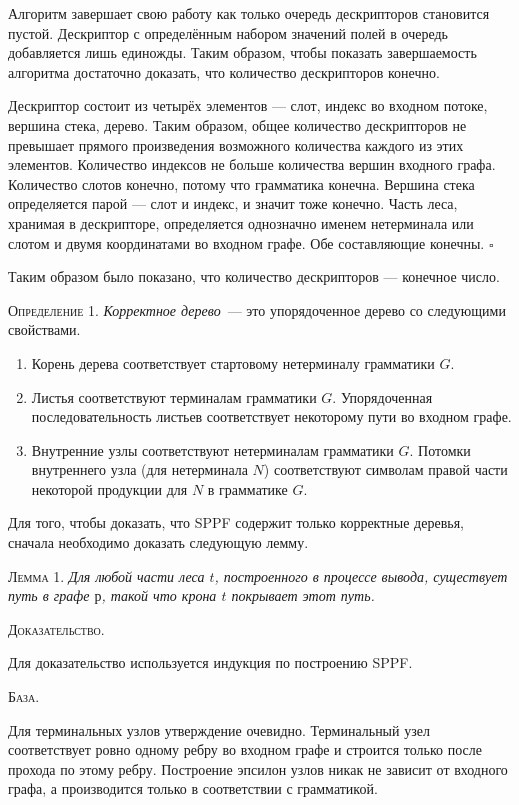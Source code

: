 \documentclass[14pt]{matmex-diploma}
\begin{document}
Алгоритм завершает свою работу как только очередь дескрипторов становится пустой. Дескриптор с определённым набором значений полей в очередь добавляется лишь единожды. Таким образом, чтобы показать завершаемость алгоритма достаточно доказать, что количество дескрипторов конечно. 

Дескриптор состоит из четырёх элементов --- слот, индекс во входном потоке, вершина стека, дерево. Таким образом, общее количество дескрипторов не превышает прямого произведения возможного количества каждого из этих элементов. Количество индексов не больше количества вершин входного графа. Количество слотов конечно, потому что грамматика конечна. Вершина стека определяется парой --- слот и индекс, и значит тоже конечно. Часть леса, хранимая в дескрипторе, определяется однозначно именем нетерминала или слотом и двумя координатами во входном графе. Обе составляющие конечны. $\square$

Таким образом было показано, что количество дескрипторов --- конечное число.

\textsc{Определение 1.} 
\emph{Корректное дерево}~--- это упорядоченное дерево со следующими свойствами.
\begin{enumerate}
  \item Корень дерева соответствует стартовому нетерминалу грамматики $G$.
  \item Листья соответствуют терминалам грамматики $G$. Упорядоченная последовательность листьев соответствует некоторому пути во входном графе.
  \item Внутренние узлы соответствуют нетерминалам грамматики $G$. Потомки внутреннего узла (для нетерминала $N$) соответствуют символам правой части некоторой продукции для $N$ в грамматике $G$.
\end{enumerate}

Для того, чтобы доказать, что SPPF содержит только корректные деревья, сначала необходимо доказать следующую лемму.

\textsc{Лемма 1.} 
\textit{Для любой части леса $t$, построенного в процессе вывода, существует путь в графе $р$, такой что крона $t$ покрывает этот путь. }

\textsc{Доказательство.}

Для доказательство используется индукция по построению SPPF. 

\textsc{База.}

Для терминальных узлов утверждение очевидно. Терминальный узел соответствует ровно одному ребру во входном графе и строится только после прохода по этому ребру. Построение эпсилон узлов никак не зависит от входного графа, а производится только в соответствии с грамматикой. 
\end{document}
